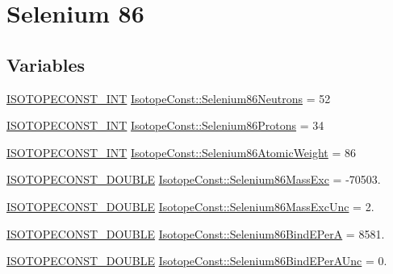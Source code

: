 \hypertarget{group___isotope_const-_selenium-_se86}{}\section{Selenium 86}
\label{group___isotope_const-_selenium-_se86}
\subsection*{Variables}
\begin{DoxyCompactItemize}
\item 
\mbox{\hyperlink{group___isotope_const-_macros_ga5f18360b3e99483a35c32d789e62621c}{I\+S\+O\+T\+O\+P\+E\+C\+O\+N\+S\+T\+\_\+\+I\+NT}} \mbox{\hyperlink{group___isotope_const-_selenium-_se86_gaccb9b45e155718eee2739265b38ba413}{Isotope\+Const\+::\+Selenium86\+Neutrons}} = 52
\item 
\mbox{\hyperlink{group___isotope_const-_macros_ga5f18360b3e99483a35c32d789e62621c}{I\+S\+O\+T\+O\+P\+E\+C\+O\+N\+S\+T\+\_\+\+I\+NT}} \mbox{\hyperlink{group___isotope_const-_selenium-_se86_gaec8077643e5c72f70a35a673cc9441f6}{Isotope\+Const\+::\+Selenium86\+Protons}} = 34
\item 
\mbox{\hyperlink{group___isotope_const-_macros_ga5f18360b3e99483a35c32d789e62621c}{I\+S\+O\+T\+O\+P\+E\+C\+O\+N\+S\+T\+\_\+\+I\+NT}} \mbox{\hyperlink{group___isotope_const-_selenium-_se86_gaa58d19483e46cbdb1a2f922f3bd879c5}{Isotope\+Const\+::\+Selenium86\+Atomic\+Weight}} = 86
\item 
\mbox{\hyperlink{group___isotope_const-_macros_ga8f45a7272ce02c0b4c65c44636ed719a}{I\+S\+O\+T\+O\+P\+E\+C\+O\+N\+S\+T\+\_\+\+D\+O\+U\+B\+LE}} \mbox{\hyperlink{group___isotope_const-_selenium-_se86_gaee9990a9e074134186470c39c72d29df}{Isotope\+Const\+::\+Selenium86\+Mass\+Exc}} = -\/70503.
\item 
\mbox{\hyperlink{group___isotope_const-_macros_ga8f45a7272ce02c0b4c65c44636ed719a}{I\+S\+O\+T\+O\+P\+E\+C\+O\+N\+S\+T\+\_\+\+D\+O\+U\+B\+LE}} \mbox{\hyperlink{group___isotope_const-_selenium-_se86_ga6125f4ab7b27fcf665c62c24c06ac727}{Isotope\+Const\+::\+Selenium86\+Mass\+Exc\+Unc}} = 2.
\item 
\mbox{\hyperlink{group___isotope_const-_macros_ga8f45a7272ce02c0b4c65c44636ed719a}{I\+S\+O\+T\+O\+P\+E\+C\+O\+N\+S\+T\+\_\+\+D\+O\+U\+B\+LE}} \mbox{\hyperlink{group___isotope_const-_selenium-_se86_ga75edf2154fc0d2d4f09e31cbb5a22bd2}{Isotope\+Const\+::\+Selenium86\+Bind\+E\+PerA}} = 8581.
\item 
\mbox{\hyperlink{group___isotope_const-_macros_ga8f45a7272ce02c0b4c65c44636ed719a}{I\+S\+O\+T\+O\+P\+E\+C\+O\+N\+S\+T\+\_\+\+D\+O\+U\+B\+LE}} \mbox{\hyperlink{group___isotope_const-_selenium-_se86_ga88f4b77d95c8bab2defe8ccc88d1858a}{Isotope\+Const\+::\+Selenium86\+Bind\+E\+Per\+A\+Unc}} = 0.

\end{DoxyCompactItemize}
